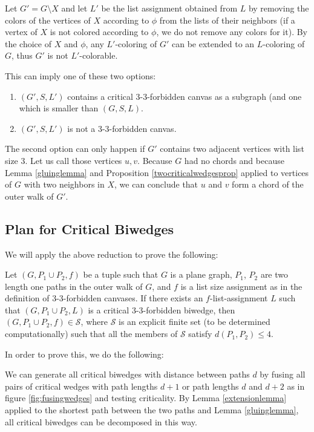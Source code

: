 Let $G' = G \setminus X$ and let $L'$ be the list assignment obtained from $L$ by removing the colors 
of the vertices of $X$ according to $\phi$ from the lists of their neighbors (if a vertex of $X$ is not
colored according to $\phi$, we do not remove any colors for it). By the choice of $X$ and $\phi$,
any $L'$-coloring of $G'$ can be extended to an $L$-coloring of $G$, thus $G'$ is not $L'$-colorable.

This can imply one of these two options:

\begin{enumerate}
	
	\item $(G', S, L')$ contains a critical 3-3-forbidden canvas as a subgraph (and one which is 
	smaller than $(G, S, L)$.
	\item $(G', S, L')$ is not a 3-3-forbidden canvas.
\end{enumerate}

The second option can only happen if $G'$ contains two adjacent vertices with list size $3$. 
Let us call those vertices $u, v$. Because $G$ had no chords and because Lemma \ref{gluinglemma} and
Proposition \ref{twocriticalwedgesprop} applied to vertices of $G$ 
with two neighbors in $X$, we can conclude that $u$ and $v$ form a chord of the outer walk of $G'$.


\subsection{Plan for Critical Biwedges}

We will apply the above reduction to prove the following:

\begin{conjecture}
\label{biwedgeconjecture}
Let $(G, P_1 \cup P_2, f)$ be a tuple such that $G$ is a plane graph, $P_1$, $P_2$ are two length one 
paths in the outer walk of $G$, and $f$ is a list size assignment as in the definition of 3-3-forbidden
canvases. If there exists an $f$-list-assignment $L$ such that $(G, P_1 \cup P_2, L)$ is a critical
3-3-forbidden biwedge, then $(G, P_1 \cup P_2, f) \in \mathcal{S}$, where $\mathcal{S}$ is an explicit
finite set (to be determined computationally) such that all the members of $\mathcal{S}$ satisfy
$d(P_1, P_2) \leq 4$.
\end{conjecture}

In order to prove this, we do the following:

We can generate all critical biwedges with distance between paths $d$ by fusing all pairs of critical
wedges with path lengths $d+1$ or path lengths $d$ and $d+2$ as in figure \ref{fig:fusingwedges}
and testing criticality. 
By Lemma \ref{extensionlemma} applied to the shortest path between the two paths and Lemma 
\ref{gluinglemma}, all critical biwedges can be decomposed in this way. 

